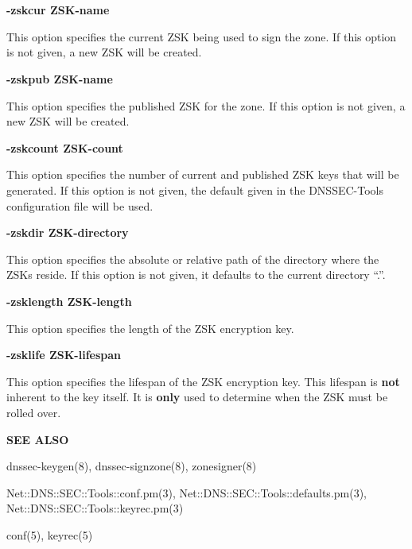 \begin{description}

\item {\bf -zskcur ZSK-name}\verb" "

This option specifies the current ZSK being used to sign the zone.
If this option is not given, a new ZSK will be created.

\item {\bf -zskpub ZSK-name}\verb" "

This option specifies the published ZSK for the zone.  If this option
is not given, a new ZSK will be created.

\item {\bf -zskcount ZSK-count}\verb" "

This option specifies the number of current and published ZSK keys that will
be generated.  If this option is not given, the default given in the
DNSSEC-Tools configuration file will be used.

\item {\bf -zskdir ZSK-directory}\verb" "

This option specifies the absolute or relative path of the directory
where the ZSKs reside.  If this option is not given, it defaults to
the current directory ``.''.

\item {\bf -zsklength ZSK-length}\verb" "

This option specifies the length of the ZSK encryption key.

\item {\bf -zsklife ZSK-lifespan}\verb" "

This option specifies the lifespan of the ZSK encryption key.  This lifespan
is {\bf not} inherent to the key itself.  It is {\bf only} used to determine
when the ZSK must be rolled over.

\end{description}

{\bf SEE ALSO}

dnssec-keygen(8),
dnssec-signzone(8),
zonesigner(8)

Net::DNS::SEC::Tools::conf.pm(3),
Net::DNS::SEC::Tools::defaults.pm(3), \\
Net::DNS::SEC::Tools::keyrec.pm(3)

conf(5),
keyrec(5)

